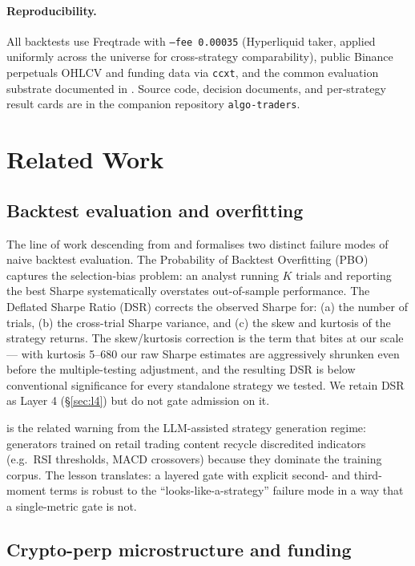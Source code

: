 \documentclass[11pt]{article}
\begin{document}
\paragraph{Reproducibility.} All backtests use Freqtrade with
\texttt{--fee 0.00035} (Hyperliquid taker, applied uniformly across the
universe for cross-strategy comparability), public Binance perpetuals OHLCV
and funding data via \texttt{ccxt}, and the common evaluation substrate
documented in \citet{decision_005}. Source code, decision documents, and
per-strategy result cards are in the companion repository \texttt{algo-traders}.

\section{Related Work}
\label{sec:related}

\subsection{Backtest evaluation and overfitting}

The line of work descending from \citet{bailey2014pbo} and
\citet{lopezdeprado2014dsr} formalises two distinct failure modes of
naive backtest evaluation. The Probability of Backtest Overfitting (PBO)
captures the selection-bias problem: an analyst running $K$ trials and
reporting the best Sharpe systematically overstates out-of-sample
performance. The Deflated Sharpe Ratio (DSR) corrects the observed Sharpe
for: (a) the number of trials, (b) the cross-trial Sharpe variance, and (c)
the skew and kurtosis of the strategy returns. The skew/kurtosis correction
is the term that bites at our scale --- with kurtosis 5--680 our raw Sharpe
estimates are aggressively shrunken even before the multiple-testing
adjustment, and the resulting DSR is below conventional significance for
every standalone strategy we tested. We retain DSR as Layer 4 (\S\ref{sec:l4})
but do not gate admission on it.

\citet{simhi2026oldhabits} is the related warning from the LLM-assisted
strategy generation regime: generators trained on retail trading content
recycle discredited indicators (e.g.\ RSI thresholds, MACD crossovers)
because they dominate the training corpus. The lesson translates: a layered
gate with explicit second- and third-moment terms is robust to the
``looks-like-a-strategy'' failure mode in a way that a single-metric gate
is not.

\subsection{Crypto-perp microstructure and funding}
\end{document}
